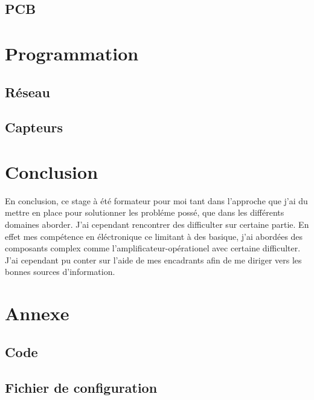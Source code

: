 \documentclass[11pt,french,a4paper]{article}
\begin{document}
\subsection{PCB}

\newpage
\section{Programmation}
\subsection{Réseau}
\subsection{Capteurs}


\newpage
\section{Conclusion}
En conclusion, ce stage à été formateur pour moi tant dans l'approche que j'ai du mettre en place pour solutionner les probléme possé, que dans les différents domaines aborder. J'ai cependant rencontrer des difficulter sur certaine partie. En effet mes compétence en éléctronique ce limitant à des basique, j'ai abordées des composants complex comme l'amplificateur-opérationel avec certaine difficulter. J'ai cependant pu conter sur l'aide de mes encadrants afin de me diriger vers les bonnes sources d'information.


\newpage
\listoffigures

\newpage
\section*{Annexe}
\subsection*{Code}
\subsection*{Fichier de configuration}
\end{document}

